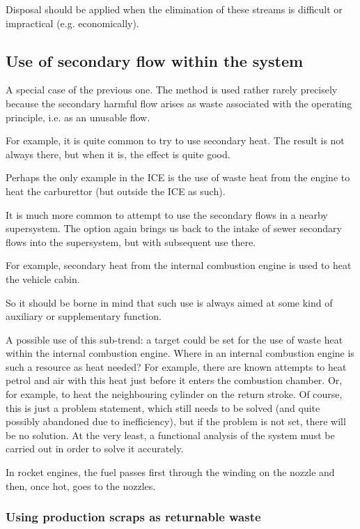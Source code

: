 \documentclass[a4paper,11pt]{article}
\begin{document}
Disposal should be applied when the elimination of these streams is difficult
or impractical (e.g. economically).

\subsection{Use of secondary flow within the system}

A special case of the previous one. The method is used rather rarely precisely
because the secondary harmful flow arises as waste associated with the
operating principle, i.e. as an unusable flow.

For example, it is quite common to try to use secondary heat. The result is
not always there, but when it is, the effect is quite good.

Perhaps the only example in the ICE is the use of waste heat from the engine
to heat the carburettor (but outside the ICE as such).

It is much more common to attempt to use the secondary flows in a nearby
supersystem. The option again brings us back to the intake of sewer secondary
flows into the supersystem, but with subsequent use there.

For example, secondary heat from the internal combustion engine is used to
heat the vehicle cabin.

So it should be borne in mind that such use is always aimed at some kind of
auxiliary or supplementary function.

A possible use of this sub-trend: a target could be set for the use of waste
heat within the internal combustion engine. Where in an internal combustion
engine is such a resource as heat needed? For example, there are known
attempts to heat petrol and air with this heat just before it enters the
combustion chamber. Or, for example, to heat the neighbouring cylinder on the
return stroke. Of course, this is just a problem statement, which still needs
to be solved (and quite possibly abandoned due to inefficiency), but if the
problem is not set, there will be no solution. At the very least, a functional
analysis of the system must be carried out in order to solve it accurately.

In rocket engines, the fuel passes first through the winding on the nozzle and
then, once hot, goes to the nozzles.

\subsubsection*{Using production scraps as returnable waste}
\end{document}
